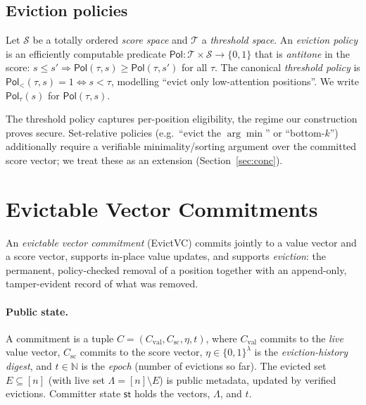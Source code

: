 \documentclass[version=submission]{iacrcc}
\theoremstyle{definition}
\newcommand{\secpar}{\lambda}
\newcommand{\bit}{\{0,1\}}
\newcommand{\aux}{\mathsf{st}}
\newcommand{\Pol}{\mathsf{Pol}}
\newcommand{\Val}{\mathrm{val}}
\newcommand{\Sc}{\mathrm{sc}}
\newcommand{\Cval}{C_{\Val}}
\newcommand{\Csc}{C_{\Sc}}
\newcommand{\Live}{\Lambda}
\newcommand{\Evicted}{E}
\newcommand{\Ssp}{\mathcal{S}}
\newcommand{\Tsp}{\mathcal{T}}
\begin{document}
\subsection{Eviction policies}

\begin{definition}\label{def:policy}
Let $\Ssp$ be a totally ordered \emph{score space} and $\Tsp$ a \emph{threshold
space}. An \emph{eviction policy} is an efficiently computable predicate
$\Pol:\Tsp\times\Ssp\to\bit$ that is \emph{antitone} in the score:
$s\le s'\Rightarrow\Pol(\tau,s)\ge\Pol(\tau,s')$ for all $\tau$. The canonical
\emph{threshold policy} is $\Pol_{<}(\tau,s)=1\iff s<\tau$, modelling ``evict
only low-attention positions''. We write $\Pol_\tau(s)$ for $\Pol(\tau,s)$.
\end{definition}

\begin{remark}
The threshold policy captures per-position eligibility, the regime our
construction proves secure. Set-relative policies (e.g.\ ``evict the $\arg\min$''
or ``bottom-$k$'') additionally require a verifiable minimality/sorting argument
over the committed score vector; we treat these as an extension
(Section~\ref{sec:conc}).
\end{remark}

\section{Evictable Vector Commitments}\label{sec:syntax}

An \emph{evictable vector commitment} (EvictVC) commits jointly to a value
vector and a score vector, supports in-place value updates, and supports
\emph{eviction}: the permanent, policy-checked removal of a position together
with an append-only, tamper-evident record of what was removed.

\paragraph{Public state.}
A commitment is a tuple $C=(\Cval,\Csc,\eta,t)$, where $\Cval$ commits to the
\emph{live} value vector, $\Csc$ commits to the score vector,
$\eta\in\bit^{\secpar}$ is the \emph{eviction-history digest}, and
$t\in\mathbb{N}$ is the \emph{epoch} (number of evictions so far). The evicted
set $\Evicted\subseteq[n]$ (with live set $\Live=[n]\setminus\Evicted$) is public
metadata, updated by verified evictions. Committer state $\aux$ holds the
vectors, $\Live$, and $t$.
\end{document}
